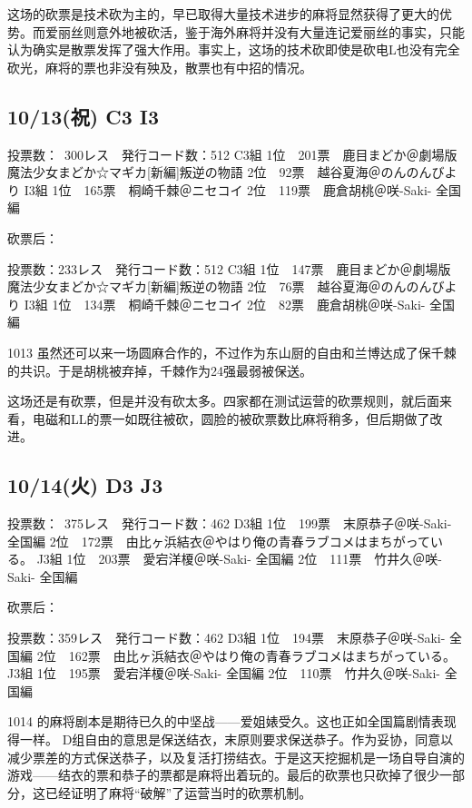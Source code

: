 这场的砍票是技术砍为主的，早已取得大量技术进步的麻将显然获得了更大的优势。而爱丽丝则意外地被砍活，鉴于海外麻将并没有大量连记爱丽丝的事实，只能认为确实是散票发挥了强大作用。事实上，这场的技术砍即使是砍电L也没有完全砍光，麻将的票也非没有殃及，散票也有中招的情况。

\subsection{10/13(祝) C3 I3}

    投票数：~300レス　発行コード数：512
    C3組
    1位　201票　鹿目まどか＠劇場版 魔法少女まどか☆マギカ[新編]叛逆の物語
    2位　92票　越谷夏海＠のんのんびより
    I3組
    1位　165票　桐崎千棘＠ニセコイ
    2位　119票　鹿倉胡桃＠咲-Saki- 全国編

砍票后：

    投票数：233レス　発行コード数：512
    C3組
    1位　147票　鹿目まどか＠劇場版 魔法少女まどか☆マギカ[新編]叛逆の物語
    2位　76票　越谷夏海＠のんのんびより
    I3組
    1位　134票　桐崎千棘＠ニセコイ
    2位　82票　鹿倉胡桃＠咲-Saki- 全国編

1013 虽然还可以来一场圆麻合作的，不过作为东山厨的自由和兰博达成了保千棘的共识。于是胡桃被弃掉，千棘作为24强最弱被保送。

这场还是有砍票，但是并没有砍太多。四家都在测试运营的砍票规则，就后面来看，电磁和LL的票一如既往被砍，圆脸的被砍票数比麻将稍多，但后期做了改进。

\subsection{10/14(火) D3 J3}

    投票数：~375レス　発行コード数：462
    D3組
    1位　199票　末原恭子＠咲-Saki- 全国編
    2位　172票　由比ヶ浜結衣＠やはり俺の青春ラブコメはまちがっている。
    J3組
    1位　203票　愛宕洋榎＠咲-Saki- 全国編
    2位　111票　竹井久＠咲-Saki- 全国編

砍票后：

    投票数：359レス　発行コード数：462
    D3組
    1位　194票　末原恭子＠咲-Saki- 全国編
    2位　162票　由比ヶ浜結衣＠やはり俺の青春ラブコメはまちがっている。
    J3組
    1位　195票　愛宕洋榎＠咲-Saki- 全国編
    2位　110票　竹井久＠咲-Saki- 全国編

1014 的麻将剧本是期待已久的中坚战——爱姐婊受久。这也正如全国篇剧情表现得一样。
D组自由的意思是保送结衣，末原则要求保送恭子。作为妥协，同意以减少票差的方式保送恭子，以及复活打捞结衣。于是这天挖掘机是一场自导自演的游戏——结衣的票和恭子的票都是麻将出着玩的。最后的砍票也只砍掉了很少一部分，这已经证明了麻将“破解”了运营当时的砍票机制。

